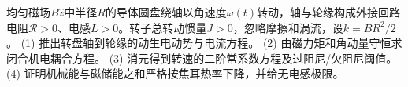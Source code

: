均匀磁场\(B\hat z\)中半径\(R\)的导体圆盘绕轴以角速度\(\omega(t)\)转动，轴与轮缘构成外接回路电阻\(\mathcal R>0\)、电感\(L>0\)。转子总转动惯量\(J>0\)，忽略摩擦和涡流，设\(k=BR^2/2\)。
(1) 推出转盘轴到轮缘的动生电动势与电流方程。
(2) 由磁力矩和角动量守恒求闭合机电耦合方程。
(3) 消元得到转速的二阶常系数方程及过阻尼/欠阻尼阈值。
(4) 证明机械能与磁储能之和严格按焦耳热率下降，并给无电感极限。
